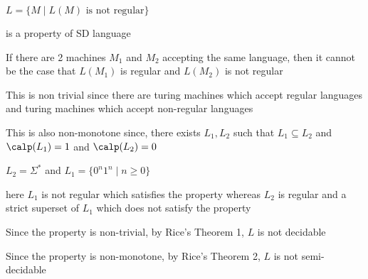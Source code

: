 
$
L = \{
    M \mid L(M) \text{ is not regular}
\}
$

is a property of SD language

If there are 2 machines $M_1$ and $M_2$ accepting the same language, then it cannot be the case that $L(M_1)$ is regular and $L(M_2)$ is not regular

This is non trivial since there are turing machines which accept regular languages and turing machines which accept non-regular languages

This is also non-monotone since, there exists $L_1, L_2$ such that $L_1 \subseteq L_2$ and $\calp(L_1) = 1$ and 
$\calp(L_2) = 0$

$L_2 = \Sigma^* $ and $L_1 = \{
    0^n1^n \mid n \geq 0
\}$

here $L_1$ is not regular which satisfies the property whereas $L_2$ is regular and a strict superset of $L_1$ which does not satisfy the property

Since the property is non-trivial, by Rice's Theorem 1, $L$ is not decidable

Since the property is non-monotone, by Rice's Theorem 2,
$L$ is not semi-decidable











